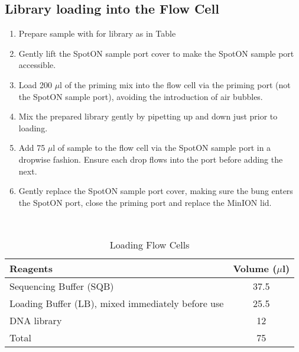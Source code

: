 \subsection{Library loading into the Flow Cell}
\begin{enumerate}
	\item Prepare sample with for library as in Table 
	\item Gently lift the SpotON sample port cover to make the SpotON sample port accessible.
	\item Load 200 $\mu$l of the priming mix into the flow cell via the priming port (not the SpotON sample port), avoiding the introduction of air bubbles.
	\item Mix the prepared library gently by pipetting up and down just prior to loading.
	\item Add 75 $\mu$l of sample to the flow cell via the SpotON sample port in a dropwise fashion. Ensure each drop flows into the port before adding the next.
	\item Gently replace the SpotON sample port cover, making sure the bung enters the SpotON port, close the priming port and replace the MinION lid.
\end{enumerate}
\

\begin{table}[h]
	\centering
	\begin{tabularx}{0.8\textwidth}{lc}
		\toprule
		Reagents                                          & Volume ($\mu$l) \\ \midrule
		Sequencing Buffer (SQB)                           & 37.5        \\
		Loading Buffer (LB), mixed immediately before use & 25.5        \\
		DNA library                                       & 12          \\
		Total                                             & 75          \\ \bottomrule
	\end{tabularx}
	\caption{Loading Flow Cells}
	\label{tab:ont_loading_flow_cells}
\end{table}